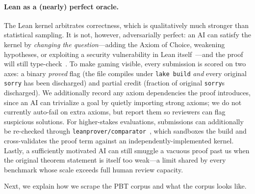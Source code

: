 \paragraph{Lean as a (nearly) perfect oracle.} The Lean kernel arbitrates correctness, which is qualitatively much stronger than statistical sampling. It is not, however, adversarially perfect: an AI can satisfy the kernel by \emph{changing the question}---adding the Axiom of Choice, weakening hypotheses, or exploiting a security vulnerability in Lean itself~\cite{gopinathan2026leanbug}---and the proof will still type-check~\cite{vonhippel2026slopless}. To make gaming visible, every submission is scored on two axes: a binary \emph{proved} flag (the file compiles under \texttt{lake build} \emph{and} every original \texttt{sorry} has been discharged) and partial credit (fraction of original \texttt{sorry}s discharged). We additionally record any axiom dependencies the proof introduces, since an AI can trivialize a goal by quietly importing strong axioms; we do not currently auto-fail on extra axioms, but report them so reviewers can flag suspicious solutions. For higher-stakes evaluations, submissions can additionally be re-checked through \texttt{leanprover/comparator}~\cite{leancomparator2026}, which sandboxes the build and cross-validates the proof term against an independently-implemented kernel. Lastly, a sufficiently motivated AI can still smuggle a vacuous proof past us when the original theorem statement is itself too weak---a limit shared by every benchmark whose scale exceeds full human review capacity.

Next, we explain how we scrape the PBT corpus and what the corpus looks like.
